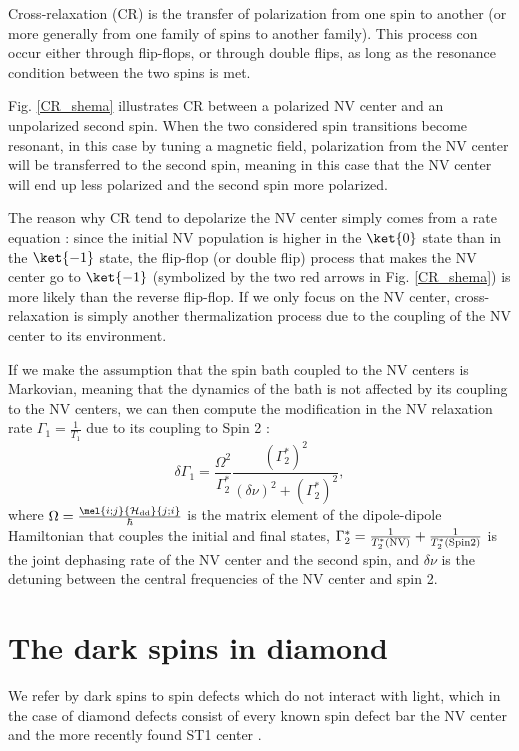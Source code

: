 \documentclass[a4paper]{report}
\begin{document}
Cross-relaxation (CR) is the transfer of polarization from one spin to another (or more generally from one family of spins to another family). This process con occur either through flip-flops, or through double flips, as long as the resonance condition between the two spins is met. 

Fig. \ref{CR_shema} illustrates CR between a polarized NV center and an unpolarized second spin. When the two considered spin transitions become resonant, in this case by tuning a magnetic field, polarization from the NV center will be transferred to the second spin, meaning in this case that the NV center will end up less polarized and the second spin more polarized. 

The reason why CR tend to depolarize the NV center simply comes from a rate equation : since the initial NV population is higher in the $\ket{0}$ state than in the $\ket{-1}$ state, the flip-flop (or double flip) process that makes the NV center go to $\ket{-1}$ (symbolized by the two red arrows in Fig. \ref{CR_shema}) is more likely than the reverse flip-flop. If we only focus on the NV center, cross-relaxation is simply another thermalization process due to the coupling of the NV center to its environment.

If we make the assumption that the spin bath coupled to the NV centers is Markovian, meaning that the dynamics of the bath is not affected by its coupling to the NV centers, we can then compute the modification in the NV relaxation rate $\Gamma_1=\frac{1}{T_1}$ due to its coupling to Spin 2 \citep{hall2016detection}:
\begin{equation}
\delta \Gamma_1=\frac{\Omega^2}{\Gamma_2^*} \frac{(\Gamma_2^*)^2}{(\delta \nu)^2+(\Gamma_2^*)^2},
\label{delta gamma 1}
\end{equation}
where $\Omega=\frac{\mel{i;j}{\mathcal{H}_{\rm dd}}{j;i}}{\hbar}$ is the matrix element of the dipole-dipole Hamiltonian that couples the initial and final states, $\Gamma_2^*=\frac{1}{T_2^*(\rm NV)}+\frac{1}{T_2^*(\rm Spin 2)}$ is the joint dephasing rate of the NV center and the second spin, and $\delta \nu$ is the detuning between the central frequencies of the NV center and spin 2.
\section{The dark spins in diamond}

We refer by dark spins to spin defects which do not interact with light, which in the case of diamond defects consist of every known spin defect bar the NV center and the more recently found ST1 center \citep{lee2013readout, john2017bright}.
\end{document}
